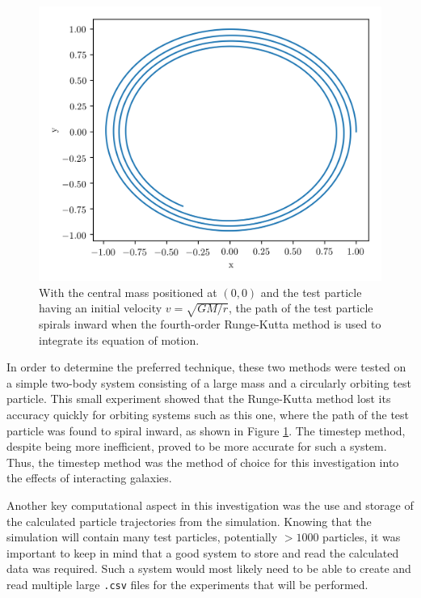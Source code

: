 \documentclass[twoside,twocolumn]{article}
\begin{document}
    \begin{figure}
        \centering
        \includegraphics[width=\linewidth]{images/RK45.png}
        \caption{With the central mass positioned at $(0, 0)$ and the test particle having an initial velocity $v = \sqrt{GM/r}$, the path of the test particle spirals inward when the fourth-order Runge-Kutta method is used to integrate its equation of motion.}
        \label{figure:RK45}
        
    \end{figure}

    In order to determine the preferred technique, these two methods were tested on a simple two-body system consisting of a large mass and a circularly orbiting test particle. This small experiment showed that the Runge-Kutta method lost its accuracy quickly for orbiting systems such as this one, where the path of the test particle was found to spiral inward, as shown in Figure \ref{figure:RK45}. The timestep method, despite being more inefficient, proved to be more accurate for such a system. Thus, the timestep method was the method of choice for this investigation into the effects of interacting galaxies.

    Another key computational aspect in this investigation was the use and storage of the calculated particle trajectories from the simulation. Knowing that the simulation will contain many test particles, potentially $>1000$ particles, it was important to keep in mind that a good system to store and read the calculated data was required. Such a system would most likely need to be able to create and read multiple large \texttt{.csv} files for the experiments that will be performed. 
    
\end{document}
